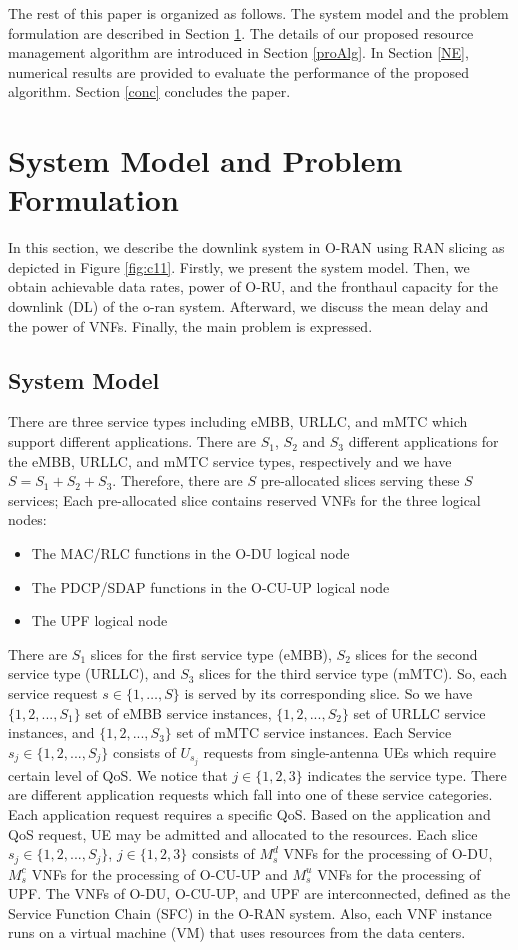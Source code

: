 \documentclass[lettersize,journal]{IEEEtran}
\begin{document}
The rest of this paper is organized as follows. The system model and the problem formulation are described in Section \ref{systemmodel}. The details of our proposed resource management algorithm are introduced in Section \ref{proAlg}. In Section \ref{NE}, numerical results are provided to evaluate the performance of the proposed algorithm. Section \ref{conc} concludes the  paper.
\section{System Model and Problem Formulation}\label{systemmodel}
In this section, we describe the downlink system in O-RAN using RAN slicing as depicted in Figure \ref{fig:c11}. 
Firstly, we present the system model. Then, we obtain achievable data rates, power of O-RU, and the fronthaul capacity for the downlink (DL) of the o-ran system. Afterward, we discuss the mean delay and the power of VNFs.
Finally, the main problem is expressed.
\subsection{System Model}
There are three service types including eMBB, URLLC, and mMTC which support different applications. There are $S_1$, $S_2$ and $S_3$ different applications for the eMBB, URLLC, and mMTC service types, respectively and we have $S = S_1 + S_2 + S_3$. 
Therefore, there are $S$ pre-allocated slices serving these $S$ services;
Each pre-allocated slice contains reserved VNFs for the three logical nodes:
\begin{itemize}
\item The MAC/RLC functions in the O-DU logical node
\item The PDCP/SDAP functions in the O-CU-UP logical node
\item The UPF logical node
\end{itemize}

There are $S_1$ slices for the first service type (eMBB), $S_2$ slices for the second service type (URLLC), and $S_3$ slices for the third service type (mMTC). So, each service request $s\in \{1,\ldots,S\}$ is served by its corresponding slice. So we have 
$\{1,2,...,S_1\}$ set of eMBB service instances, $\{1,2,...,S_2\}$ set of URLLC service instances, and
$\{1,2,...,S_3\}$ set of mMTC service instances.
Each Service $s_j\in \{1,2,...,S_j\} $ consists of $U_{s_j}$ requests from  single-antenna UEs which require certain level of QoS. We notice that $j \in \{1,2,3\}$ indicates the service type.
There are different application requests which fall into one of these service categories. Each application request requires a specific QoS. Based on the application and QoS request, UE may be admitted and allocated to the resources.
Each slice $s_j \in \{1,2,...,S_j \}$, $j \in \{1,2,3\}$ consists of  $M_s^{d}$ VNFs for the processing of O-DU, $M_s^{c}$ VNFs for the processing of O-CU-UP and $M_s^{u}$ VNFs for the processing of UPF. 
The VNFs of O-DU, O-CU-UP, and UPF are interconnected, defined as the Service Function Chain (SFC) in the O-RAN system. Also, each VNF instance runs on a virtual machine (VM) that uses resources from the data centers.
\end{document}

